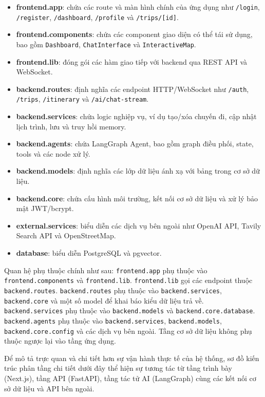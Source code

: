 \documentclass[../DoAn.tex]{subfiles}
\begin{document}
\begin{itemize}
    \item \textbf{frontend.app}: chứa các route và màn hình chính của ứng dụng như \texttt{/login}, \texttt{/register}, \texttt{/dashboard}, \texttt{/profile} và \texttt{/trips/[id]}.
    \item \textbf{frontend.components}: chứa các component giao diện có thể tái sử dụng, bao gồm \texttt{Dashboard}, \texttt{ChatInterface} và \texttt{InteractiveMap}.
    \item \textbf{frontend.lib}: đóng gói các hàm giao tiếp với backend qua REST API và WebSocket.
    \item \textbf{backend.routes}: định nghĩa các endpoint HTTP/WebSocket như \texttt{/auth}, \texttt{/trips}, \texttt{/itinerary} và \texttt{/ai/chat-stream}.
    \item \textbf{backend.services}: chứa logic nghiệp vụ, ví dụ tạo/xóa chuyến đi, cập nhật lịch trình, lưu và truy hồi memory.
    \item \textbf{backend.agents}: chứa LangGraph Agent, bao gồm graph điều phối, state, tools và các node xử lý.
    \item \textbf{backend.models}: định nghĩa các lớp dữ liệu ánh xạ với bảng trong cơ sở dữ liệu.
    \item \textbf{backend.core}: chứa cấu hình môi trường, kết nối cơ sở dữ liệu và xử lý bảo mật JWT/bcrypt.
    \item \textbf{external.services}: biểu diễn các dịch vụ bên ngoài như OpenAI API, Tavily Search API và OpenStreetMap.
    \item \textbf{database}: biểu diễn PostgreSQL và pgvector.
\end{itemize}

Quan hệ phụ thuộc chính như sau: \texttt{frontend.app} phụ thuộc vào \texttt{frontend.components} và \texttt{frontend.lib}. \texttt{frontend.lib} gọi các endpoint thuộc \texttt{backend.routes}. \texttt{backend.routes} phụ thuộc vào \texttt{backend.services}, \texttt{backend.core} và một số model để khai báo kiểu dữ liệu trả về. \texttt{backend.services} phụ thuộc vào \texttt{backend.models} và \texttt{backend.core.database}. \texttt{backend.agents} phụ thuộc vào \texttt{backend.services}, \texttt{backend.models}, \texttt{backend.core.config} và các dịch vụ bên ngoài. Tầng cơ sở dữ liệu không phụ thuộc ngược lại vào tầng ứng dụng.

Để mô tả trực quan và chi tiết hơn sự vận hành thực tế của hệ thống, sơ đồ kiến trúc phân tầng chi tiết dưới đây thể hiện sự tương tác từ tầng trình bày (Next.js), tầng API (FastAPI), tầng tác tử AI (LangGraph) cùng các kết nối cơ sở dữ liệu và API bên ngoài.
\end{document}
